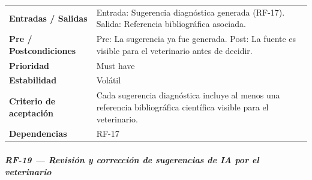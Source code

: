 \documentclass[
]{article}
\begin{document}
{\begin{longtable}[]{|
  >{\raggedright\arraybackslash}p{}|
  >{\raggedright\arraybackslash}p{}|}
\begin{minipage}[t]{\linewidth}
\end{minipage} \\
\hline
\textbf{Entradas / Salidas} & \begin{minipage}[t]{\linewidth}\raggedright
Entrada: Sugerencia diagnóstica generada (RF-17). Salida: Referencia bibliográfica asociada.
\end{minipage} \\
\hline
\textbf{Pre / Postcondiciones} & \begin{minipage}[t]{\linewidth}\raggedright
Pre: La sugerencia ya fue generada. Post: La fuente es visible para el veterinario antes de decidir.
\end{minipage} \\
\hline
\textbf{Prioridad} & \begin{minipage}[t]{\linewidth}\raggedright
Must have
\end{minipage} \\
\hline
\textbf{Estabilidad} & \begin{minipage}[t]{\linewidth}\raggedright
Volátil
\end{minipage} \\
\hline
\textbf{Criterio de aceptación} &
\begin{minipage}[t]{\linewidth}\raggedright
Cada sugerencia diagnóstica incluye al menos una referencia bibliográfica científica visible para el veterinario.
\end{minipage} \\
\hline
\textbf{Dependencias} & \begin{minipage}[t]{\linewidth}\raggedright
RF-17
\end{minipage} \\
\hline
\end{longtable}
}

\subparagraph{RF-19 --- Revisión y corrección de sugerencias de IA por el veterinario}\label{rf-19-revisi-n-y-correcci-n-de-sugerencias-de-}
\end{document}
